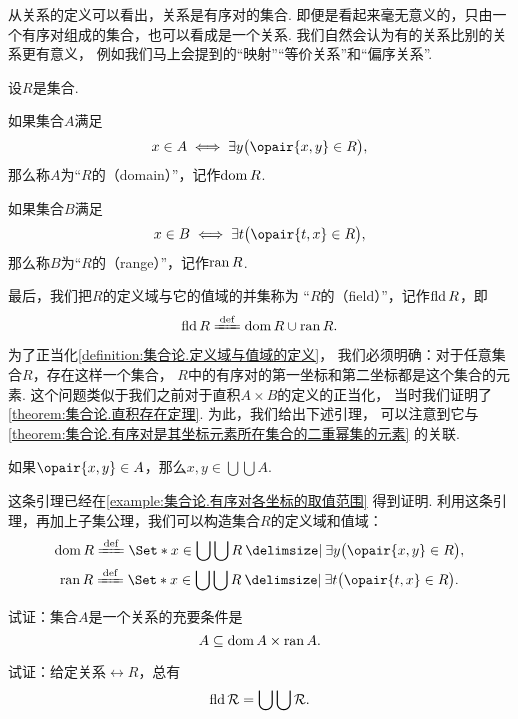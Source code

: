 从关系的定义可以看出，关系是有序对的集合.
即便是看起来毫无意义的，只由一个有序对组成的集合，也可以看成是一个关系.
我们自然会认为有的关系比别的关系更有意义，
例如我们马上会提到的“映射”“等价关系”和“偏序关系”.

\begin{definition}\label{definition:集合论.定义域与值域的定义}
设\(R\)是集合.

如果集合\(A\)满足\[
	x \in A \iff \exists y \bigl( \opair{x,y} \in R \bigr),
\]
那么称\(A\)为“\(R\)的（domain）”，记作\(\operatorname{dom} R\).

如果集合\(B\)满足\[
	x \in B \iff \exists t \bigl( \opair{t,x} \in R \bigr),
\]
那么称\(B\)为“\(R\)的（range）”，记作\(\operatorname{ran} R\).

最后，我们把\(R\)的定义域与它的值域的并集称为
“\(R\)的（field）”，记作\(\operatorname{fld} R\)，即\[
	\fld R \defeq \dom R \cup \ran R.
\]
\end{definition}

为了正当化\cref{definition:集合论.定义域与值域的定义}，
我们必须明确：对于任意集合\(R\)，存在这样一个集合，
\(R\)中的有序对的第一坐标和第二坐标都是这个集合的元素.
这个问题类似于我们之前对于直积\(A \times B\)的定义的正当化，
当时我们证明了\cref{theorem:集合论.直积存在定理}.
为此，我们给出下述引理，
可以注意到它与\cref{theorem:集合论.有序对是其坐标元素所在集合的二重幂集的元素} 的关联.

\begin{lemma}
如果\(\opair{x,y} \in A\)，那么\(x,y \in \bigcup\bigcup A\).
\end{lemma}
这条引理已经在\cref{example:集合论.有序对各坐标的取值范围} 得到证明.
利用这条引理，再加上子集公理，我们可以构造集合\(R\)的定义域和值域：
\begin{gather}
	\dom R
	\defeq
	\Set*{ x \in \bigcup\bigcup R \given \exists y \bigl( \opair{x,y} \in R \bigr) }, \\
	\ran R
	\defeq
	\Set*{ x \in \bigcup\bigcup R \given \exists t \bigl( \opair{t,x} \in R \bigr) }.
\end{gather}

\begin{example}
试证：集合\(A\)是一个关系的充要条件是\[
	A \subseteq \operatorname{dom} A \times \operatorname{ran} A.
\]
\end{example}

\begin{example}
试证：给定关系\(\rel{R}\)，总有\[
	\operatorname{fld} \mathcal{R} = \bigcup\bigcup \mathcal{R}.
\]
\end{example}

